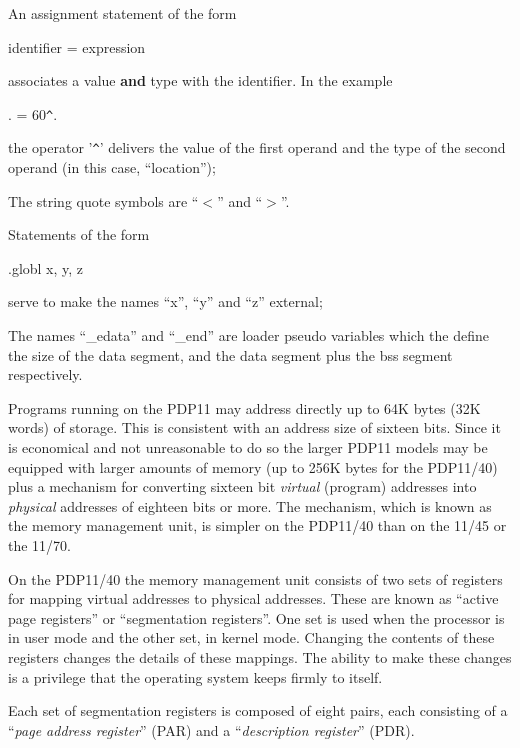 \item[(i)] An assignment statement of the
form

\bc
identifier = expression
\ec

associates a value {\bf and} type with
the identifier. In the example

\bc
. = 60\verb+^+.
\ec

the operator '\verb+^+' delivers the
value of the first operand and
the type of the second operand
(in this case, ``location'');

\item[(j)] The string quote symbols
are ``$<$'' and ``$>$''.

\item[(k)] Statements of the form

\bc
.globl x, y, z
\ec

serve to make the names ``x'', ``y''
and ``z'' external;

\item[(l)] The names ``\_edata'' and ``\_end''
are loader pseudo variables
which the define the size of the
data segment, and the data segment
plus the bss segment
respectively.
\ed



Programs running on the PDP11 may
address directly up to 64K bytes (32K
words) of storage. This is consistent
with an address size of sixteen bits.
Since it is economical and not unreasonable
to do so the larger PDP11
models may be equipped with larger
amounts of memory (up to 256K bytes for
the PDP11/40) plus a mechanism for
converting sixteen bit {\it virtual} (program)
addresses into {\it physical} addresses of
eighteen bits or more. The mechanism,
which is known as the memory management
unit, is simpler on the PDP11/40 than
on the 11/45 or the 11/70.

On the PDP11/40 the memory management
unit consists of two sets of registers
for mapping virtual addresses to physical
addresses. These are known as
``active page registers'' or ``segmentation
registers''. One set is used when
the processor is in user mode and the
other set, in kernel mode. Changing the
contents of these registers changes the
details of these mappings. The ability
to make these changes is a privilege
that the operating system keeps firmly
to itself.


Each set of segmentation registers is
composed of eight pairs, each consisting
of a ``{\it page address register}'' (PAR)
and a ``{\it description register}''
(PDR).

